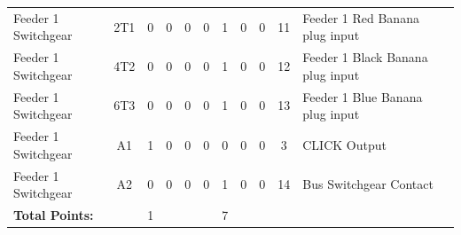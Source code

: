 \begin{table}[!htp]
{\begin{tabular}{lcccccccccll}
			Feeder 1 Switchgear          & 2T1                     & 0                                           & 0                                          & 0           & 0           & 1            & 0                & 0 & 11                           & Feeder 1 Red Banana plug input   &                \\
			Feeder 1 Switchgear          & 4T2                     & 0                                           & 0                                          & 0           & 0           & 1            & 0                & 0 & 12                           & Feeder 1 Black Banana plug input &                \\
			Feeder 1 Switchgear          & 6T3                     & 0                                           & 0                                          & 0           & 0           & 1            & 0                & 0 & 13                           & Feeder 1 Blue Banana plug input  &                \\
			Feeder 1 Switchgear          & A1                      & 1                                           & 0                                          & 0           & 0           & 0            & 0                & 0 & 3                            & CLICK Output                     &                \\
			Feeder 1 Switchgear          & A2                      & 0                                           & 0                                          & 0           & 0           & 1            & 0                & 0 & 14                           & Bus Switchgear Contact           &                \\ \midrule
			\textbf{Total Points:}       &                         & 1                                           &                                            &             &             & 7            &                  &   &                              &                                  &                \\ \bottomrule
		\end{tabular}
	}
\end{table}
